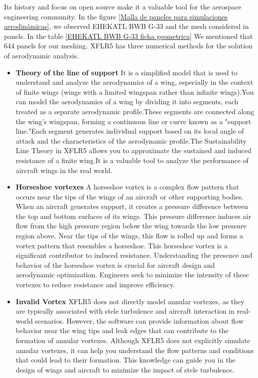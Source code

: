   Its history and focus on open source make it a valuable tool for the aerospace engineering community.
%
In the figure \ref{Malla de paneles para simulaciones aerodinámicas}, we observed EHEKATL BWB G-33 and the mesh considered in panels. In the table \ref{EHEKATL BWB G-33 ficha geometrica} We mentioned that 644 panels for our meshing. XFLR5 has three numerical methods for the solution of aerodynamic analysis. 
\begin{itemize}
    \item \textbf{Theory of the line of support} It is a simplified model that is used to understand and analyze the aerodynamics of a wing, especially in the context of finite wings (wings with a limited wingspan rather than infinite wings).You can model the aerodynamics of a wing by dividing it into segments, each treated as a separate aerodynamic profile.These segments are connected along the wing's wingspan, forming a continuous line or curve known as a "support line."Each segment generates individual support based on its local angle of attack and the characteristics of the aerodynamic profile.The Sustainability Line Theory in XFLR5 allows you to approximate the sustained and induced resistance of a finite wing.It is a valuable tool to analyze the performance of aircraft wings in the real world.
    \item \textbf{Horseshoe vortexes} A horseshoe vortex is a complex flow pattern that occurs near the tips of the wings of an aircraft or other supporting bodies. When an aircraft generates support, it creates a pressure difference between the top and bottom surfaces of its wings. This pressure difference induces air flow from the high pressure region below the wing towards the low pressure region above. Near the tips of the wings, this flow is rolled up and forms a vortex pattern that resembles a horseshoe. This horseshoe vortex is a significant contributor to induced resistance. Understanding the presence and behavior of the horseshoe vortex is crucial for aircraft design and aerodynamic optimization. Engineers seek to minimize the intensity of these vortexes to reduce resistance and improve efficiency.
    \item \textbf{Invalid Vortex} XFLR5 does not directly model annular vortexes, as they are typically associated with stele turbulence and aircraft interaction in real-world scenarios. However, the software can provide information about flow behavior near the wing tips and leak edges that can contribute to the formation of annular vortexes. Although XFLR5 does not explicitly simulate annular vortexes, it can help you understand the flow patterns and conditions that could lead to their formation. This knowledge can guide you in the design of wings and aircraft to minimize the impact of stele turbulence.

\end{itemize}
